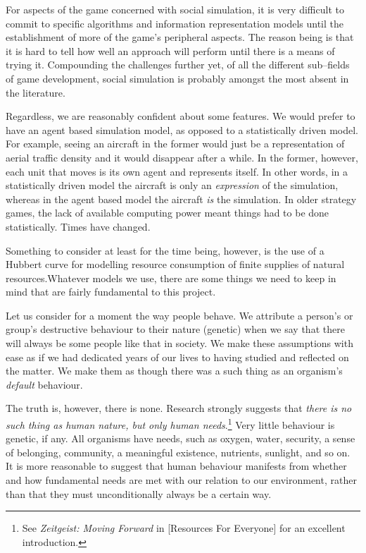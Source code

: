 For aspects of the game concerned with social simulation, it is very difficult to commit to specific algorithms and information representation models until the establishment of more of the game's peripheral aspects. The reason being is that it is hard to tell how well an approach will perform until there is a means of trying it. Compounding the challenges further yet, of all the different sub--fields of game development, social simulation is probably amongst the most absent in the literature.

Regardless, we are reasonably confident about some features. We would prefer to have an agent based simulation model, as opposed to a statistically driven model. For example, seeing an aircraft in the former would just be a representation of aerial traffic density and it would disappear after a while. In the former, however, each unit that moves is its own agent and represents itself. In other words, in a statistically driven model the aircraft is only an {\it expression} of the simulation, whereas in the agent based model the aircraft {\it is} the simulation. In older strategy games, the lack of available computing power meant things had to be done statistically. Times have changed.

Something to consider at least for the time being, however, is the use of a Hubbert curve for modelling resource consumption of finite supplies of natural resources. Whatever models we use, there are some things we need to keep in mind that are fairly fundamental to this project. 

Let us consider for a moment the way people behave. We attribute a person's or group's destructive behaviour to their nature (genetic) when we say that there will always be some people like that in society. We make these assumptions with ease as if we had dedicated years of our lives to having studied and reflected on the matter. We make them as though there was a such thing as an organism's {\it default} behaviour.

The truth is, however, there is none. Research strongly suggests that {\it there is no such thing as human nature, but only human needs}.\footnote{See {\it Zeitgeist: Moving Forward} in [Resources For Everyone] for an excellent introduction.} Very little behaviour is genetic, if any. All organisms have needs, such as oxygen, water, security, a sense of belonging, community, a meaningful existence, nutrients, sunlight, and so on. It is more reasonable to suggest that human behaviour manifests from whether and how fundamental needs are met with our relation to our environment, rather than that they must unconditionally always be a certain way.

